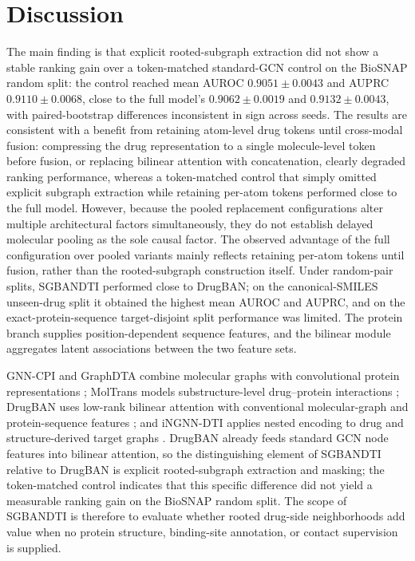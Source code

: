 \documentclass[computers,article,submit,moreauthors]{Definitions/mdpi}
\begin{document}
\section{Discussion}
The main finding is that explicit rooted-subgraph extraction did not show a stable ranking gain over a token-matched standard-GCN control on the BioSNAP random split: the control reached mean AUROC $0.9051 \pm 0.0043$ and AUPRC $0.9110 \pm 0.0068$, close to the full model's $0.9062 \pm 0.0019$ and $0.9132 \pm 0.0043$, with paired-bootstrap differences inconsistent in sign across seeds. The results are consistent with a benefit from retaining atom-level drug tokens until cross-modal fusion: compressing the drug representation to a single molecule-level token before fusion, or replacing bilinear attention with concatenation, clearly degraded ranking performance, whereas a token-matched control that simply omitted explicit subgraph extraction while retaining per-atom tokens performed close to the full model. However, because the pooled replacement configurations alter multiple architectural factors simultaneously, they do not establish delayed molecular pooling as the sole causal factor. The observed advantage of the full configuration over pooled variants mainly reflects retaining per-atom tokens until fusion, rather than the rooted-subgraph construction itself. Under random-pair splits, SGBANDTI performed close to DrugBAN; on the canonical-SMILES unseen-drug split it obtained the highest mean AUROC and AUPRC, and on the exact-protein-sequence target-disjoint split performance was limited. The protein branch supplies position-dependent sequence features, and the bilinear module aggregates latent associations between the two feature sets.

GNN-CPI and GraphDTA combine molecular graphs with convolutional protein representations \citep{tsubaki2019,nguyen2021graphdta}; MolTrans models substructure-level drug--protein interactions \citep{huang2021moltrans}; DrugBAN uses low-rank bilinear attention with conventional molecular-graph and protein-sequence features \citep{bai2023drugban}; and iNGNN-DTI applies nested encoding to drug and structure-derived target graphs \citep{sun2024ingnndti}. DrugBAN already feeds standard GCN node features into bilinear attention, so the distinguishing element of SGBANDTI relative to DrugBAN is explicit rooted-subgraph extraction and masking; the token-matched control indicates that this specific difference did not yield a measurable ranking gain on the BioSNAP random split. The scope of SGBANDTI is therefore to evaluate whether rooted drug-side neighborhoods add value when no protein structure, binding-site annotation, or contact supervision is supplied.
\end{document}
